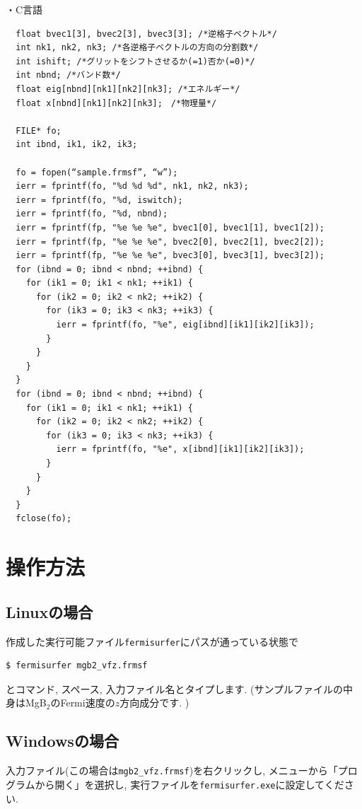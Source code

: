 \documentclass[12pt]{jarticle}
\begin{document}
・C言語

\begin{verbatim}
  float bvec1[3], bvec2[3], bvec3[3]; /*逆格子ベクトル*/
  int nk1, nk2, nk3; /*各逆格子ベクトルの方向の分割数*/
  int ishift; /*グリットをシフトさせるか(=1)否か(=0)*/
  int nbnd; /*バンド数*/
  float eig[nbnd][nk1][nk2][nk3]; /*エネルギー*/
  float x[nbnd][nk1][nk2][nk3];　/*物理量*/

  FILE* fo;
  int ibnd, ik1, ik2, ik3;

  fo = fopen(“sample.frmsf”, “w”);
  ierr = fprintf(fo, "%d %d %d", nk1, nk2, nk3);
  ierr = fprintf(fo, "%d, iswitch);
  ierr = fprintf(fo, "%d, nbnd);
  ierr = fprintf(fp, "%e %e %e", bvec1[0], bvec1[1], bvec1[2]); 
  ierr = fprintf(fp, "%e %e %e", bvec2[0], bvec2[1], bvec2[2]);
  ierr = fprintf(fp, "%e %e %e", bvec3[0], bvec3[1], bvec3[2]);
  for (ibnd = 0; ibnd < nbnd; ++ibnd) {  
    for (ik1 = 0; ik1 < nk1; ++ik1) { 
      for (ik2 = 0; ik2 < nk2; ++ik2) { 
        for (ik3 = 0; ik3 < nk3; ++ik3) { 
          ierr = fprintf(fo, "%e", eig[ibnd][ik1][ik2][ik3]); 
        } 
      } 
    } 
  } 
  for (ibnd = 0; ibnd < nbnd; ++ibnd) {  
    for (ik1 = 0; ik1 < nk1; ++ik1) { 
      for (ik2 = 0; ik2 < nk2; ++ik2) { 
        for (ik3 = 0; ik3 < nk3; ++ik3) { 
          ierr = fprintf(fo, "%e", x[ibnd][ik1][ik2][ik3]); 
        } 
      } 
    } 
  } 
  fclose(fo); 
\end{verbatim}

\section{操作方法}

\subsection{Linuxの場合}
作成した実行可能ファイル\verb|fermisurfer|にパスが通っている状態で
\begin{verbatim}
$ fermisurfer mgb2_vfz.frmsf
\end{verbatim}
とコマンド, スペース, 入力ファイル名とタイプします. 
(サンプルファイルの中身はMgB$_2$のFermi速度の$z$方向成分です. )

\subsection{Windowsの場合}

入力ファイル(この場合は\verb|mgb2_vfz.frmsf|)を右クリックし,
メニューから「プログラムから開く」を選択し,
実行ファイルを\verb|fermisurfer.exe|に設定してください.
\end{document}
